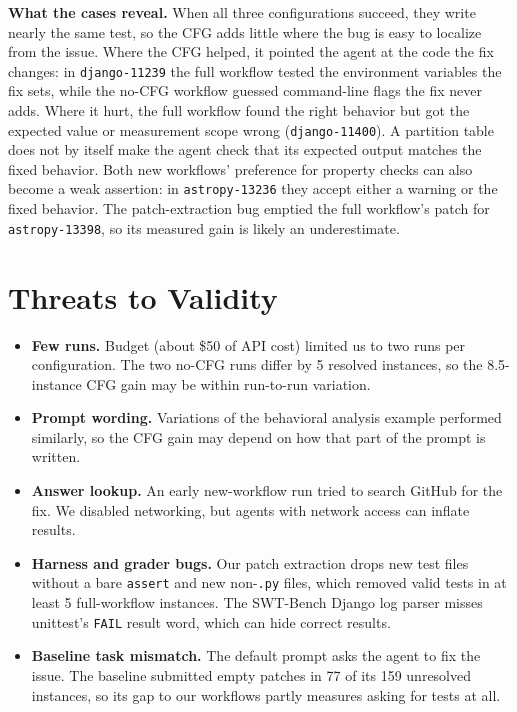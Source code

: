 \documentclass[conference]{IEEEtran}
\begin{document}
\textbf{What the cases reveal.} When all three configurations succeed, they write nearly the same test, so the CFG adds little where the bug is easy to localize from the issue. Where the CFG helped, it pointed the agent at the code the fix changes: in \texttt{django-11239} the full workflow tested the environment variables the fix sets, while the no-CFG workflow guessed command-line flags the fix never adds. Where it hurt, the full workflow found the right behavior but got the expected value or measurement scope wrong (\texttt{django-11400}). A partition table does not by itself make the agent check that its expected output matches the fixed behavior. Both new workflows' preference for property checks can also become a weak assertion: in \texttt{astropy-13236} they accept either a warning or the fixed behavior. The patch-extraction bug emptied the full workflow's patch for \texttt{astropy-13398}, so its measured gain is likely an underestimate.

\section{Threats to Validity}
\label{sec:threats}
\begin{itemize}
  \item \textbf{Few runs.} Budget (about \$50 of API cost) limited us to two runs per configuration. The two no-CFG runs differ by 5 resolved instances, so the 8.5-instance CFG gain may be within run-to-run variation.
  \item \textbf{Prompt wording.} Variations of the behavioral analysis example performed similarly, so the CFG gain may depend on how that part of the prompt is written.
  \item \textbf{Answer lookup.} An early new-workflow run tried to search GitHub for the fix. We disabled networking, but agents with network access can inflate results.
  \item \textbf{Harness and grader bugs.} Our patch extraction drops new test files without a bare \texttt{assert} and new non-\texttt{.py} files, which removed valid tests in at least 5 full-workflow instances. The SWT-Bench Django log parser misses unittest's \texttt{FAIL} result word, which can hide correct results.
  \item \textbf{Baseline task mismatch.} The default prompt asks the agent to fix the issue. The baseline submitted empty patches in 77 of its 159 unresolved instances, so its gap to our workflows partly measures asking for tests at all.
\end{itemize}
\end{document}
